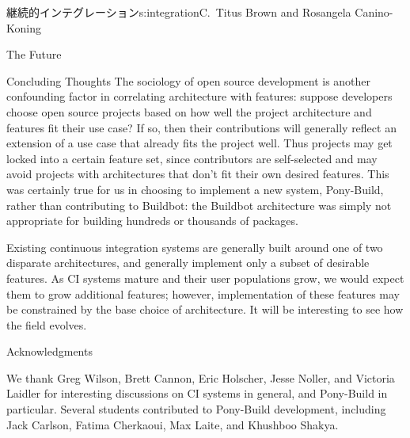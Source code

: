 \begin{aosachapter}{継続的インテグレーション}{s:integration}{C.\ Titus Brown and Rosangela Canino-Koning}
\begin{aosasect1}{The Future}
\begin{aosasect2}{Concluding Thoughts}
The sociology of open source development is another confounding factor
in correlating architecture with features: suppose developers choose
open source projects based on how well the project architecture and
features fit their use case?  If so, then their contributions will
generally reflect an extension of a use case that already fits the
project well. Thus projects may get locked into a certain feature set,
since contributors are self-selected and may avoid projects with
architectures that don't fit their own desired features. This was
certainly true for us in choosing to implement a new system,
Pony-Build, rather than contributing to Buildbot: the Buildbot
architecture was simply not appropriate for building hundreds or
thousands of packages.

Existing continuous integration systems are generally built around one
of two disparate architectures, and generally implement only a subset
of desirable features.  As CI systems mature and their user
populations grow, we would expect them to grow additional features;
however, implementation of these features may be constrained by the
base choice of architecture.  It will be interesting to see how the
field evolves.

\end{aosasect2}

\begin{aosasect2}{Acknowledgments}

We thank Greg Wilson, Brett Cannon, Eric Holscher, Jesse Noller, and
Victoria Laidler for interesting discussions on CI systems in general,
and Pony-Build in particular.  Several students contributed to
Pony-Build development, including Jack Carlson, Fatima Cherkaoui, Max
Laite, and Khushboo Shakya.

\end{aosasect2}

\end{aosasect1}

\end{aosachapter}
